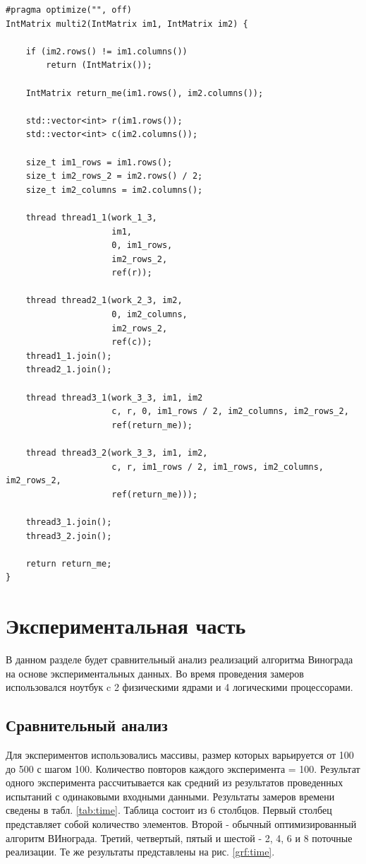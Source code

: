 \documentclass[a4paper, 14pt]{article}
\begin{document}
	\begin{lstlisting}[label=multi2,caption=Двупоточная реализация алгоритма Винограда]
       #pragma optimize("", off)
IntMatrix multi2(IntMatrix im1, IntMatrix im2) {

    if (im2.rows() != im1.columns())
        return (IntMatrix());

    IntMatrix return_me(im1.rows(), im2.columns());

    std::vector<int> r(im1.rows());
    std::vector<int> c(im2.columns());

    size_t im1_rows = im1.rows();
    size_t im2_rows_2 = im2.rows() / 2;
    size_t im2_columns = im2.columns();

    thread thread1_1(work_1_3,
                     im1, 
                     0, im1_rows,
                     im2_rows_2, 
                     ref(r));

    thread thread2_1(work_2_3, im2,
                     0, im2_columns,
                     im2_rows_2, 
                     ref(c));
    thread1_1.join();
    thread2_1.join();

    thread thread3_1(work_3_3, im1, im2
                     c, r, 0, im1_rows / 2, im2_columns, im2_rows_2,
                     ref(return_me));

    thread thread3_2(work_3_3, im1, im2,
                     c, r, im1_rows / 2, im1_rows, im2_columns, im2_rows_2,
                     ref(return_me)));

    thread3_1.join();
    thread3_2.join();

    return return_me;
}
	\end{lstlisting}
	
    \newpage
	\section{Экспериментальная часть}
	\hspace{1cm} В данном разделе будет сравнительный анализ реализаций алгоритма Винограда на основе экспериментальных данных. Во время проведения замеров использовался ноутбук c 2 физическими ядрами и 4 логическими процессорами.
    
      
    \subsection{Сравнительный анализ}
    \hspace{1cm}Для экспериментов использовались массивы, размер которых варьируется от 100 до 500 с шагом 100. 
    Количество повторов каждого эксперимента = 100. Результат одного эксперимента рассчитывается как средний из результатов проведенных испытаний с одинаковыми входными данными. Результаты замеров времени сведены в табл. \ref{tab:time}. Таблица состоит из 6 столбцов. Первый столбец представляет собой количество элементов. Второй - обычный оптимизированный алгоритм ВИнограда. Третий, четвертый, пятый и шестой - 2, 4, 6 и 8 поточные реализации. Те же результаты представлены на рис. \ref{grf:time}.
\end{document}
